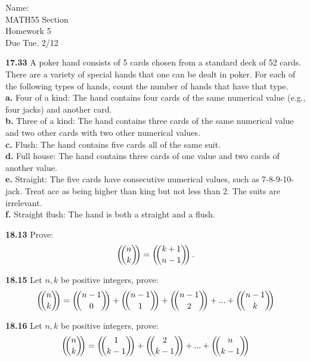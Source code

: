 \documentclass[10pt]{article}
\def\multichooseA#1#2{\left(\kern-.3em\binom{#1}{#2}\kern-.3em\right)}
\def\multichooseB#1#2{\big(\kern-.3em\binom{#1}{#2}\kern-.3em\big)}
\newcommand{\multichoose}[2]{\mathchoice{\multichooseA{#1}{#2}}{\multichooseB{#1}{#2}}{\multichooseA{#1}{#2}}{\multichooseA{#1}{#2}}}
\begin{document}
\begin{flushright}
	Name: \underline{\hspace{3cm}} \\
	MATH55 Section \underline{\hspace{0.5cm}} \\
	Homework 5 \\
	Due Tue. 2/12
\end{flushright}

\begin{framed}
    \textbf{17.33} A poker hand consists of 5 cards chosen from a standard deck of 52 cards.
    There are a variety of special hands that one can be dealt in poker. For
    each of the following types of hands, count the number of hands that have that type.\\

    \indent \textbf{a.} Four of a kind: The hand contains four cards of the same numerical value (e.g., four
    jacks) and another card.\\
    \indent \textbf{b.} Three of a kind: The hand contains three cards of the same numerical value and two
    other cards with two other numerical values.\\
    \indent \textbf{c.} Flush: The hand contains five cards all of the same suit.\\
    \indent \textbf{d.} Full house: The hand contains three cards of one value and two cards of another value.\\
    \indent \textbf{e.} Straight: The five cards have consecutive numerical values, such as 7-8-9-10-jack.
    Treat ace as being higher than king but not less than 2. The suits are irrelevant.\\
    \indent \textbf{f.} Straight flush: The hand is both a straight and a flush.
\end{framed}

\pagebreak

\begin{framed}
    \textbf{18.13} Prove:
    $$
        \multichoose{n}{k} = \multichoose{k+1}{n-1}.
    $$
\end{framed}

\pagebreak

\begin{framed}
    \textbf{18.15} Let $n, k$ be positive integers, prove:
    $$
    \multichoose{n}{k} = \multichoose{n-1}{0} + \multichoose{n-1}{1}
    + \multichoose{n-1}{2} + ...  + \multichoose{n-1}{k}
    $$
\end{framed}

\pagebreak

\begin{framed}
    \textbf{18.16} Let $n,k$ be positive integers, prove:
    $$
    \multichoose{n}{k} = \multichoose{1}{k-1} + \multichoose{2}{k-1}
    +  ...  + \multichoose{n}{k-1}
    $$
\end{framed}
\end{document}
